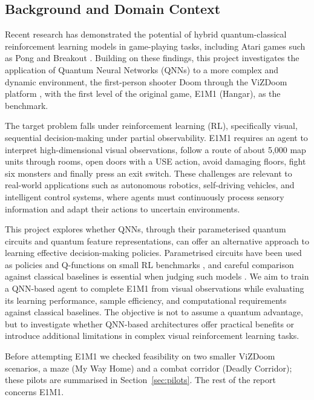 \documentclass[10pt, a4paper]{article}
\begin{document}
\subsection{Background and Domain Context}
Recent research has demonstrated the potential of hybrid quantum-classical reinforcement learning models in game-playing tasks, including Atari games such as Pong and Breakout \cite{freinberger_quantum_2024}. Building on these findings, this project investigates the application of Quantum Neural Networks (QNNs) to a more complex and dynamic environment, the first-person shooter Doom through the ViZDoom platform \cite{kempka_vizdoom_2016}, with the first level of the original game, E1M1 (Hangar), as the benchmark.

The target problem falls under reinforcement learning (RL), specifically visual, sequential decision-making under partial observability. E1M1 requires an agent to interpret high-dimensional visual observations, follow a route of about 5,000 map units through rooms, open doors with a USE action, avoid damaging floors, fight six monsters and finally press an exit switch. These challenges are relevant to real-world applications such as autonomous robotics, self-driving vehicles, and intelligent control systems, where agents must continuously process sensory information and adapt their actions to uncertain environments.

This project explores whether QNNs, through their parameterised quantum circuits and quantum feature representations, can offer an alternative approach to learning effective decision-making policies. Parametrised circuits have been used as policies and Q-functions on small RL benchmarks \cite{chen_vqc_drl_2020,jerbi_pqp_2021,skolik_gym_2022}, and careful comparison against classical baselines is essential when judging such models \cite{bowles_benchmark_2024}. We aim to train a QNN-based agent to complete E1M1 from visual observations while evaluating its learning performance, sample efficiency, and computational requirements against classical baselines. The objective is not to assume a quantum advantage, but to investigate whether QNN-based architectures offer practical benefits or introduce additional limitations in complex visual reinforcement learning tasks.

Before attempting E1M1 we checked feasibility on two smaller ViZDoom scenarios, a maze (My Way Home) and a combat corridor (Deadly Corridor); these pilots are summarised in Section~\ref{sec:pilots}. The rest of the report concerns E1M1.
\end{document}
